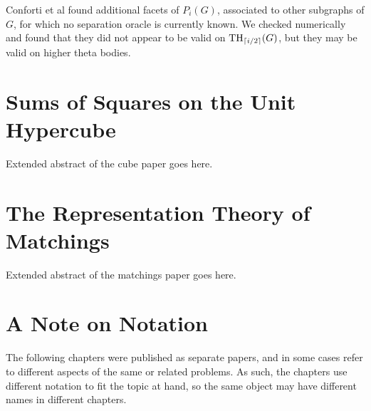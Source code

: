 Conforti et al \cite{conforti} found additional facets of $P_i(G)$, associated to other subgraphs of $G$, for which no separation oracle is currently known. 
We checked numerically and found that they did not appear to be valid on $\textup{TH}_{\lceil i/2\rceil}(G)$, but they may be valid on higher theta bodies.




\section{Sums of Squares on the Unit Hypercube}

Extended abstract of the cube paper goes here.

\section{The Representation Theory of Matchings}

Extended abstract of the matchings paper goes here.

\section{A Note on Notation}
The following chapters were published as separate papers, and in some cases refer to different aspects of the same or related problems. 
As such, the chapters use different notation to fit the topic at hand, so the same object may have different names in different chapters.
